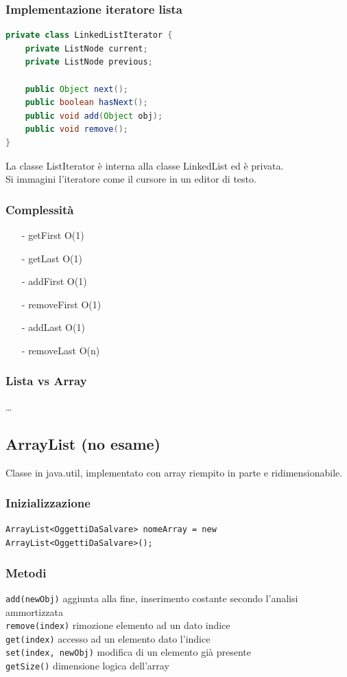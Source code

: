 \documentclass{article}
\begin{document}
\subsubsection*{Implementazione iteratore lista}
\begin{lstlisting}[language=Java]
private class LinkedListIterator {
	private ListNode current;
	private ListNode previous;

	public Object next();
	public boolean hasNext();
	public void add(Object obj);
	public void remove();
}
\end{lstlisting}
La classe ListIterator è interna alla classe LinkedList ed è privata. \\
Si immagini l'iteratore come il cursore in un editor di testo.

\subsubsection*{Complessità}
\begin{itemize} [topsep=3pt, itemsep=0pt]
	\item[-] getFirst O(1)
	\item[-] getLast O(1)
	\item[-] addFirst O(1)
	\item[-] removeFirst O(1)
	\item[-] addLast O(1)
	\item[-] removeLast O(n)
\end{itemize}

\subsubsection*{Lista vs Array}
\dots

\newpage

\subsection{ArrayList (no esame)}
Classe in java.util, implementato con array riempito in parte e ridimensionabile.
\subsubsection*{Inizializzazione}
\verb|ArrayList<OggettiDaSalvare> nomeArray = new ArrayList<OggettiDaSalvare>();|

\subsubsection*{Metodi}
\verb|add(newObj)| aggiunta alla fine, inserimento costante secondo l'analisi ammortizzata \\
\verb|remove(index)| rimozione elemento ad un dato indice \\
\verb|get(index)| accesso ad un elemento dato l'indice \\
\verb|set(index, newObj)| modifica di un elemento già presente \\
\verb|getSize()| dimensione logica dell'array
\newpage
\end{document}

